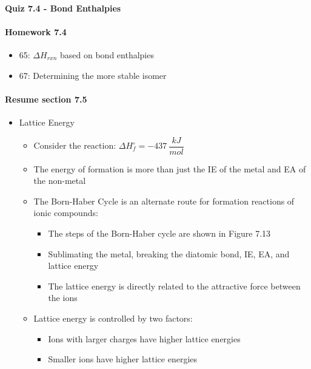 \documentclass[12pt, openany, letterpaper]{memoir}
\begin{document}
\paragraph*{Quiz 7.4 - Bond Enthalpies}
\paragraph*{Homework 7.4}
\begin{itemize}
  \item 65: $\Delta H_{rxn}$ based on bond enthalpies
  \item 67: Determining the more stable isomer
\end{itemize}

\paragraph*{Resume section 7.5}
\begin{itemize}
  \item Lattice Energy
    \begin{itemize}
      \item Consider the reaction:  \hspace{1em}$\Delta H^\circ_f = -437~\dfrac{kJ}{mol}$
      \item The energy of formation is more than just the IE of the metal and EA of the non-metal
      \item The Born-Haber Cycle is an alternate route for formation reactions of ionic compounds:
        \begin{itemize}
          \item The steps of the Born-Haber cycle are shown in Figure 7.13
          \item Sublimating the metal, breaking the diatomic bond, IE, EA, and lattice energy
          \item The lattice energy is directly related to the attractive force between the ions
        \end{itemize}
      \item Lattice energy is controlled by two factors:
        \begin{itemize}
          \item Ions with larger charges have higher lattice energies
          \item Smaller ions have higher lattice energies
        \end{itemize}
    \end{itemize}
\end{itemize}
\end{document}
